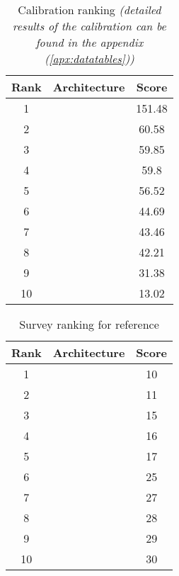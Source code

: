 \begin{table}[h]
    \label{table:calibration}
    \centering
    \caption{Calibration ranking \textit{(detailed results of the calibration can be found in the appendix (\ref{apx:datatables}))}}
    \begin{tabular}{ |c|c|c| }
    \hline
    Rank & Architecture & Score \\
    \hline
    1 & \nameref{fig:architecture10} & 151.48 \\
    2 & \nameref{fig:architecture3} & 60.58 \\
    3 & \nameref{fig:architecture8} & 59.85 \\
    4 & \nameref{fig:architecture6} & 59.8 \\
    5 & \nameref{fig:architecture2} & 56.52 \\
    6 & \nameref{fig:architecture5} & 44.69 \\
    7 & \nameref{fig:architecture1} & 43.46 \\
    8 & \nameref{fig:architecture4} & 42.21 \\
    9 & \nameref{fig:architecture9} & 31.38 \\
    10 & \nameref{fig:architecture7} & 13.02 \\
    \hline
    \end{tabular}
\end{table}

\begin{table}[h]
    \label{table:survey2}
    \centering
    \caption{Survey ranking for reference}
    \begin{tabular}{ |c|c|c| }
    \hline
    Rank & Architecture & Score \\
    \hline
    1 & \nameref{fig:architecture3} & 10 \\
    2 & \nameref{fig:architecture8} & 11 \\
    3 & \nameref{fig:architecture6} & 15 \\
    4 & \nameref{fig:architecture10} & 16 \\
    5 & \nameref{fig:architecture2} & 17 \\
    6 & \nameref{fig:architecture1} & 25 \\
    7 & \nameref{fig:architecture5} & 27 \\
    8 & \nameref{fig:architecture7} & 28 \\
    9 & \nameref{fig:architecture9} & 29 \\
    10 & \nameref{fig:architecture4} & 30\\
    \hline
    \end{tabular}
\end{table}